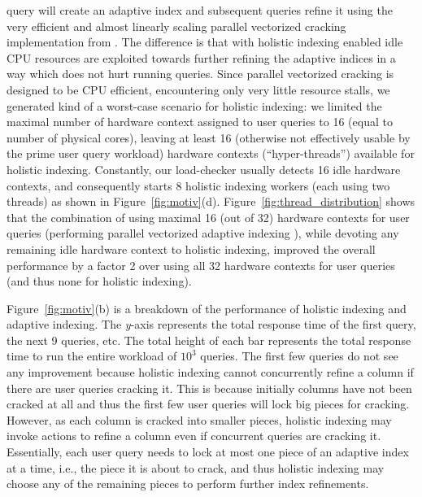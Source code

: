 query will create an adaptive index and subsequent queries refine it using the very efficient and almost linearly
scaling parallel vectorized cracking implementation from \cite{efficient_cracking}.
The difference is that with holistic indexing enabled idle CPU resources are exploited towards further refining the adaptive indices
in a way which does not hurt running queries.
Since parallel vectorized cracking \cite{efficient_cracking} is designed to be CPU efficient, encountering only very little resource stalls,
we generated kind of a worst-case scenario for holistic indexing: we limited the maximal
number of hardware context assigned to user queries to 16 (equal to number
of physical cores), leaving at least 16 (otherwise not effectively usable
by the prime user query workload) hardware contexts (``hyper-threads'')
available for holistic indexing.
Constantly, our load-checker usually detects 16 idle hardware contexts, and consequently
starts 8 holistic indexing workers (each using two threads) as shown in
Figure~\ref{fig:motiv}(d). Figure~\ref{fig:thread_distribution} shows that the combination of using maximal 16 (out of
32) hardware contexts for user queries (performing parallel vectorized adaptive indexing \cite{efficient_cracking}), while devoting any
remaining idle hardware context to holistic indexing, improved the overall
performance by a factor 2 over using all 32 hardware contexts for user
queries (and thus none for holistic indexing).


Figure~\ref{fig:motiv}(b) is a breakdown 
of the performance of holistic indexing and adaptive indexing.
The \emph{y}-axis represents the total response time of the first query, the next 9 queries, etc.
The total height of each bar represents the total response time to run the entire workload of $10^3$ queries.
The first few queries do not see any improvement because holistic indexing cannot concurrently refine a column if there are user queries cracking it. 
This is because initially columns have not been 
cracked at all and thus the first few user queries will lock big pieces for cracking. However,
as each column is cracked into smaller pieces, holistic indexing may invoke  actions to refine 
a column even if concurrent queries are cracking it. 
Essentially, each user query needs to lock at most one piece of an adaptive index at a time, i.e., the piece it is about to crack,
and thus holistic indexing may choose any of the remaining pieces to perform further index refinements.

